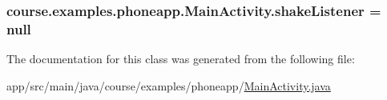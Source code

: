 \subsubsection[{shake\+Listener}]{ course.\+examples.\+phoneapp.\+Main\+Activity.\+shake\+Listener = null}\label{classcourse_1_1examples_1_1phoneapp_1_1_main_activity_a7e9ef0d32b848b4c425981d38bef06fd}


The documentation for this class was generated from the following file\+:\begin{DoxyCompactItemize}
\item 
app/src/main/java/course/examples/phoneapp/\hyperlink{_main_activity_8java}{Main\+Activity.\+java}\end{DoxyCompactItemize}
